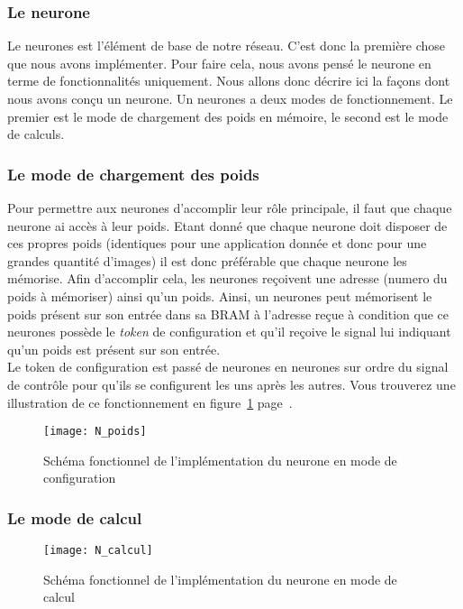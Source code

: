 \subsubsection{Le neurone}
	Le neurones est l'élément de base de notre réseau.
	C'est donc la première chose que nous avons implémenter.
	Pour faire cela, nous avons pensé le neurone en terme de
	fonctionnalités uniquement.
	Nous allons donc décrire ici la façons dont nous avons conçu un neurone. 
	Un neurones a deux modes de fonctionnement.
	Le premier est le mode de chargement des poids en mémoire, le second
	est le mode de calculs.

	\subsubsection{Le mode de chargement des poids}
	Pour permettre aux neurones d'accomplir leur rôle principale, il faut que chaque neurone ai
	accès à leur poids. Etant donné que chaque neurone doit disposer de ces propres poids
	(identiques pour une application donnée et donc pour une grandes quantité d'images)
	il est donc préférable que chaque neurone les mémorise. Afin d'accomplir cela,
	les neurones reçoivent une adresse (numero du poids à mémoriser) ainsi qu'un poids.
	Ainsi, un neurones peut mémorisent le poids présent sur son entrée dans
	sa BRAM à l'adresse reçue à condition que ce neurones possède le {\em token} de
	configuration et qu'il reçoive le signal lui indiquant qu'un poids est présent sur son entrée.\\
	Le token de configuration est passé de neurones en neurones
	sur ordre du signal de contrôle pour qu'ils se configurent les uns après les autres.
	Vous trouverez une illustration de ce fonctionnement en
	figure~\ref{fig:N_poids} page~\pageref{fig:N_poids}.
	\begin{figure}[h!]
		\begin{center}
			\texttt{[image: N\_poids]}
			\caption{Schéma fonctionnel de l'implémentation du neurone en mode de configuration}
			\label{fig:N_poids}
		\end{center}
	\end{figure}

	\subsubsection{Le mode de calcul}
	\begin{figure}[h!]
		\begin{center}
			\texttt{[image: N\_calcul]}
			\caption{Schéma fonctionnel de l'implémentation du neurone en mode de calcul}
			\label{fig:N_calcul}
		\end{center}
	\end{figure}

